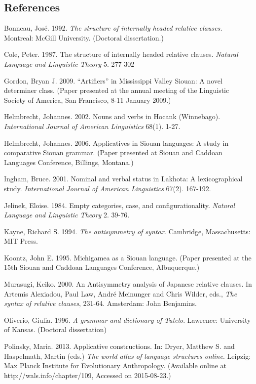 \begin{refsection}
\section*{References}
 

\printbibliography[heading=subbibliography,notkeyword=this]
\begin{reflist}

Bonneau, Jos\'e. 1992. \textit{The structure of internally headed relative clauses.} Montreal: McGill University. (Doctoral dissertation.) 

Cole, Peter. 1987. The structure of internally headed relative clauses. \textit{Natural Language and Linguistic Theory} 5. 277-302

Gordon, Bryan J. 2009. ``Artifiers'' in Mississippi Valley Siouan: A novel determiner class. (Paper presented at the annual meeting of the Linguistic Society of America, San Francisco, 8-11 January 2009.)

Helmbrecht, Johannes. 2002. Nouns and verbs in Hocank (Winnebago). \textit{International Journal of American Linguistics} 68(1). 1-27.

Helmbrecht, Johannes. 2006. Applicatives in Siouan languages: A study in comparative Siouan grammar. (Paper presented at Siouan and Caddoan Languages Conference, Billings, Montana.)

Ingham, Bruce. 2001. Nominal and verbal status in Lakhota: A lexicographical study. \textit{International Journal of American Linguistics} 67(2). 167-192.

Jelinek, Eloise. 1984. Empty categories, case, and configurationality. \textit{Natural Language and Linguistic Theory} 2. 39-76.

Kayne, Richard S. 1994. \textit{The antisymmetry of syntax}. Cambridge, Massachusetts: MIT Press.
                 
Koontz, John E. 1995. Michigamea as a Siouan language. (Paper presented at the 15th Siouan and Caddoan Languages Conference, Albuquerque.)

Murasugi, Keiko. 2000. An Antisymmetry analysis of Japanese relative clauses. In Artemis Alexiadou, Paul Law, Andr\'e Meinunger and Chris Wilder, eds., \textit{The syntax of relative clauses}, 231-64. Amsterdam: John Benjamins. 

Oliverio, Giulia. 1996. \textit{A grammar and dictionary of Tutelo}. Lawrence: University of Kansas. (Doctoral dissertation)

Polinsky, Maria. 2013. Applicative constructions. In: Dryer, Matthew S. and Haspelmath, Martin (eds.) \textit{The world atlas of language structures online}. Leipzig: Max Planck Institute for Evolutionary Anthropology. (Available online at http://wals.info/chapter/109, Accessed on 2015-08-23.)


\end{reflist}
\end{refsection}
